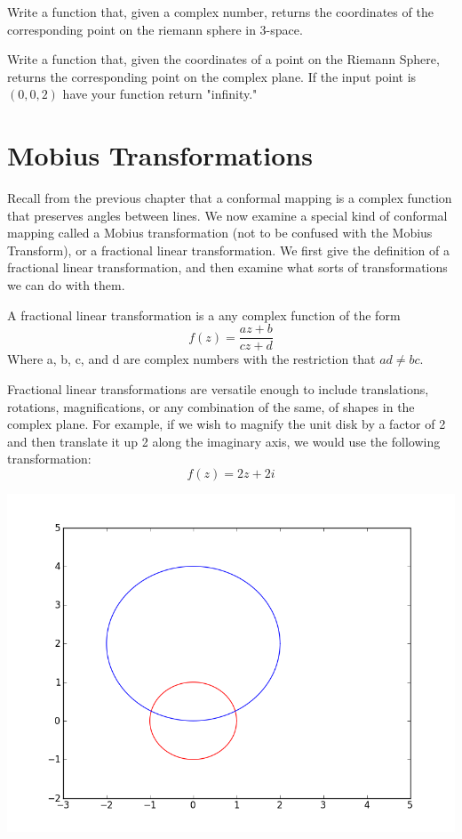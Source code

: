 \begin{problem}  Write a function that, given a complex number, returns the coordinates of the corresponding point on the riemann sphere in 3-space.
\end{problem}

\begin{problem}
Write a function that, given the coordinates of a point on the Riemann Sphere, returns the corresponding point on the complex plane. If the input point is $(0,0,2)$ have your function return "infinity."
\end{problem}

\section*{Mobius Transformations}

Recall from the previous chapter that a conformal mapping is a complex function that preserves angles between lines.  We now examine a special kind of conformal mapping called a Mobius transformation (not to be confused with the Mobius Transform), or a fractional linear transformation.  We first give the definition of a fractional linear transformation, and then examine what sorts of transformations we can do with them.

\begin{definition}  A fractional linear transformation is a any complex function of the form
\[
f(z) = \frac{az + b}{cz + d}
\]
 Where a, b, c, and d are complex numbers with the restriction that $ad \neq bc$.
\end{definition}

Fractional linear transformations are versatile enough to include translations, rotations, magnifications, or any combination of the same, of shapes in the complex plane.  For example, if we wish to magnify the unit disk by a factor of 2 and then translate it up 2 along the imaginary axis, we would use the following transformation:
\[
f(z)=2z+2i
\]

\includegraphics[width=\textwidth]{mobius1.png}

